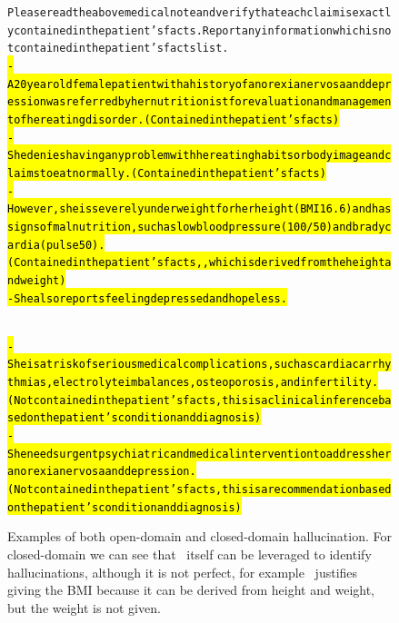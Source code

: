 \begin{figure}[H]
\begin{AIbox}{\DV}
{\begin{alltt}
    Please read the above medical note and verify that each claim is exactly contained in the patient's facts. Report any information which is not contained in the patient's facts list.\\
    
    \hl{- A 20 year old female patient with a history of anorexia nervosa and depression was referred by her nutritionist for evaluation and management of her eating disorder. (Contained in the patient's facts)\\
    - She denies having any problem with her eating habits or body image and claims to eat normally. (Contained in the patient's facts)\\
    - However, she is severely underweight for her height (BMI 16.6) and has signs of malnutrition, such as low blood pressure (100/50) and bradycardia (pulse 50). (Contained in the patient's facts,} \hl{, which is derived from the height and weight)\\
    - She also reports feeling depressed and hopeless. } 
    
    \\
    \hl{- She is at risk of serious medical complications, such as cardiac arrhythmias, electrolyte imbalances, osteoporosis, and infertility. (Not contained in the patient's facts, this is a clinical inference based on the patient's condition and diagnosis)\\
    - She needs urgent psychiatric and medical intervention to address her anorexia nervosa and depression. (Not contained in the patient's facts, this is a recommendation based on the patient's condition and diagnosis)}
    \end{alltt}}
    \end{AIbox}
    \caption{Examples of both open-domain and closed-domain hallucination. For closed-domain we can see that \DV\ itself can be leveraged to identify hallucinations, although it is not perfect, for example \DV\ justifies giving the BMI because it can be derived from height and weight, but the weight is not given.}\label{fig:hallucination}
    \end{figure}
